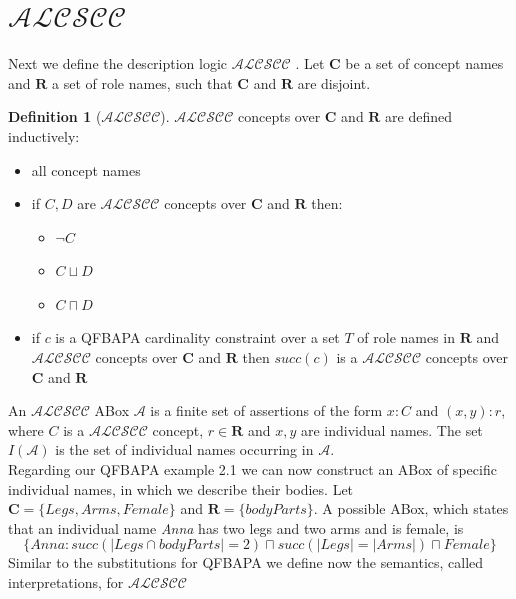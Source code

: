\documentclass{book}
\theoremstyle{break}
\theoremstyle{definition}
\newtheorem{mydef}{Definition}
\begin{document}
\section{$\mathcal{ALCSCC}$}
Next we define the description logic $\mathcal{ALCSCC}$ \cite{4}. Let $\mathbf{C}$ be a set of concept names and $\mathbf{R}$ a set of role names, such that $\mathbf{C}$ and $\mathbf{R}$ are disjoint.
\begin{mydef}[$\mathcal{ALCSCC}$]
$\mathcal{ALCSCC}$ concepts over $\mathbf{C}$ and $\mathbf{R}$ are defined inductively:
\begin{itemize}
\item all concept names
\item if $C,D$ are $\mathcal{ALCSCC}$ concepts over $\mathbf{C}$ and $\mathbf{R}$ then:
\begin{itemize}
\item $\neg C$
\item $C\sqcup D$
\item $C\sqcap D$
\end{itemize}
\item if $c$ is a QFBAPA cardinality constraint over a set $T$ of role names in $\mathbf{R}$ and $\mathcal{ALCSCC}$ concepts over $\mathbf{C}$ and $\mathbf{R}$ then $succ(c)$ is a $\mathcal{ALCSCC}$ concepts over $\mathbf{C}$ and $\mathbf{R}$
\end{itemize}
\end{mydef}
An $\mathcal{ALCSCC}$ ABox $\mathcal{A}$ is a finite set of assertions of the form $x:C$ and $(x,y):r$, where $C$ is a $\mathcal{ALCSCC}$ concept, $r\in\mathbf{R}$ and $x,y$ are individual names. The set $I(\mathcal{A})$ is the set of individual names occurring in $\mathcal{A}$.\\
Regarding our QFBAPA example 2.1 we can now construct an ABox of specific individual names, in which we describe their bodies. Let $\mathbf{C}=\{Legs,Arms,Female\}$ and $\mathbf{R}=\{bodyParts\}$. A possible ABox, which states that an individual name \textit{Anna} has two legs and two arms and is female, is 
\begin{equation}
\{Anna:succ(|Legs\cap bodyParts|=2)\sqcap succ(|Legs|=|Arms|)\sqcap Female\}
\end{equation}
Similar to the substitutions for QFBAPA we define now the semantics, called interpretations, for $\mathcal{ALCSCC}$
\end{document}

